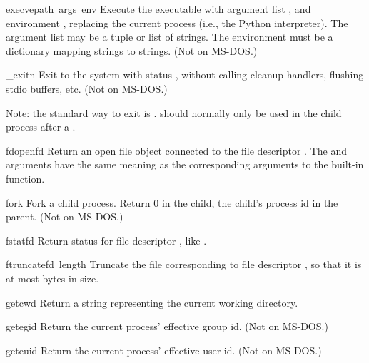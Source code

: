 \begin{funcdesc}{execve}{path\, args\, env}
Execute the executable  with argument list ,
and environment ,
replacing the current process (i.e., the Python interpreter).
The argument list may be a tuple or list of strings.
The environment must be a dictionary mapping strings to strings.
(Not on MS-DOS.)
\end{funcdesc}

\begin{funcdesc}{_exit}{n}
Exit to the system with status , without calling cleanup
handlers, flushing stdio buffers, etc.
(Not on MS-DOS.)

Note: the standard way to exit is .
 should normally only be used in the child process
after a .
\end{funcdesc}

\begin{funcdesc}{fdopen}{fd}
Return an open file object connected to the file descriptor .
The  and  arguments have the same meaning as
the corresponding arguments to the built-in  function.
\end{funcdesc}

\begin{funcdesc}{fork}{}
Fork a child process.  Return 0 in the child, the child's process id
in the parent.
(Not on MS-DOS.)
\end{funcdesc}

\begin{funcdesc}{fstat}{fd}
Return status for file descriptor , like .
\end{funcdesc}

\begin{funcdesc}{ftruncate}{fd\, length}
Truncate the file corresponding to file descriptor , 
so that it is at most  bytes in size.
\end{funcdesc}

\begin{funcdesc}{getcwd}{}
Return a string representing the current working directory.
\end{funcdesc}

\begin{funcdesc}{getegid}{}
Return the current process' effective group id.
(Not on MS-DOS.)
\end{funcdesc}

\begin{funcdesc}{geteuid}{}
Return the current process' effective user id.
(Not on MS-DOS.)
\end{funcdesc}

